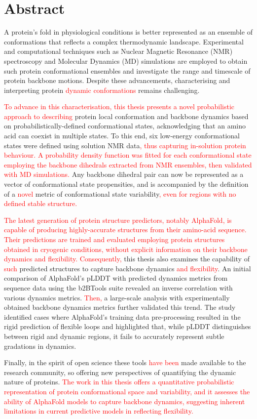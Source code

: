\chapter*{Abstract}

A protein's fold in physiological conditions is better represented as an ensemble of conformations that reflects a complex thermodynamic landscape. Experimental and computational techniques such as Nuclear Magnetic Resonance (NMR) spectroscopy and Molecular Dynamics (MD) simulations are employed to obtain such protein conformational ensembles and investigate the range and timescale of protein backbone motions. Despite these advancements, characterising and interpreting protein \textcolor{red}{dynamic conformations} remains challenging.

\textcolor{red}{To advance in this characterisation, this thesis presents a novel probabilistic approach to describing} protein local conformation and backbone dynamics based on probabilistically-defined conformational states, acknowledging that an amino acid can coexist in multiple states. To this end, six low-energy conformational states were defined using solution NMR data\textcolor{red}{, thus capturing in-solution protein behaviour. A probability density function was fitted for each conformational state employing the backbone dihedrals extracted from NMR ensembles, then validated with MD simulations.} Any backbone dihedral pair can now be represented as a vector of conformational state propensities, and is accompanied by the definition of a \textcolor{red}{novel} metric of conformational state variability\textcolor{red}{, even for regions with no defined stable structure.}

\textcolor{red}{The latest generation of protein structure predictors, notably AlphaFold, is capable of producing highly-accurate structures from their amino-acid sequence. Their predictions are trained and evaluated employing protein structures obtained in cryogenic conditions, without explicit information on their backbone dynamics and flexibility. Consequently,}
 this thesis also examines the capability of \textcolor{red}{such} predicted structures to capture backbone dynamics \textcolor{red}{and flexibility}. An initial comparison of AlphaFold's pLDDT with predicted dynamics metrics from sequence data using the b2BTools suite revealed an inverse correlation with various dynamics metrics. \textcolor{red}{Then,} a large-scale analysis with experimentally obtained backbone dynamics metrics further validated this trend. The study identified cases where AlphaFold’s training data pre-processing resulted in the rigid prediction of flexible loops and highlighted that, while pLDDT distinguishes between rigid and dynamic regions, it fails to accurately represent subtle gradations in dynamics.

Finally, in the spirit of open science these tools \textcolor{red}{have been} made available to the research community, so offering new perspectives of quantifying the dynamic nature of proteins. \textcolor{red}{The work in this thesis offers a quantitative probabilistic representation of protein conformational space and variability, and it assesses the ability of AlphaFold models to capture backbone dynamics, suggesting inherent limitations in current predictive models in reflecting flexibility.}